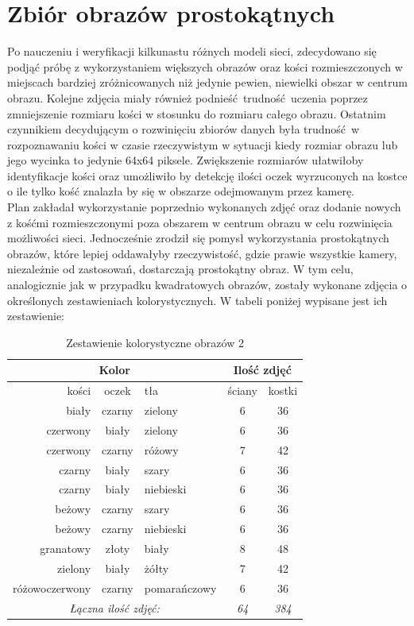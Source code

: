  \section{Zbiór obrazów prostokątnych}

Po nauczeniu i weryfikacji kilkunastu różnych modeli sieci, zdecydowano się podjąć
próbę z wykorzystaniem większych obrazów oraz kości rozmieszczonych w miejscach
bardziej zróżnicowanych niż jedynie pewien, niewielki obszar w centrum obrazu.
Kolejne zdjęcia miały również podnieść trudność uczenia poprzez zmniejszenie
rozmiaru kości w stosunku do rozmiaru całego obrazu. Ostatnim czynnikiem decydującym o
rozwinięciu zbiorów danych była trudność w rozpoznawaniu kości w czasie rzeczywistym
w sytuacji kiedy rozmiar obrazu lub jego wycinka to jedynie 64x64 piksele. Zwiększenie
rozmiarów ułatwiłoby identyfikacje kości oraz umożliwiło by detekcję ilości oczek
wyrzuconych na kostce o ile tylko kość znalazła by się w obszarze odejmowanym przez kamerę. \\
Plan zakładał wykorzystanie poprzednio wykonanych zdjęć oraz dodanie nowych
z kośćmi rozmieszczonymi poza obszarem w centrum obrazu w celu rozwinięcia możliwości sieci.
Jednocześnie zrodził się pomysł wykorzystania prostokątnych obrazów, które lepiej oddawałyby
rzeczywistość, gdzie prawie wszystkie kamery, niezależnie od zastosowań, dostarczają
prostokątny obraz. W tym celu, analogicznie jak w przypadku kwadratowych obrazów,
zostały wykonane zdjęcia o określonych zestawieniach kolorystycznych. W tabeli poniżej
wypisane jest ich zestawienie:

\begin{table}[h!]
\centering
\begin{tabular}{rcl|cc}
 \multicolumn{3}{c}{Kolor} & \multicolumn{2}{c}{Ilość zdjęć} \\ \hline
kości & oczek & tła & ściany & kostki \\ \hline
biały & czarny & zielony & 6 & 36 \\
czerwony & biały & zielony & 6 & 36 \\
czerwony & czarny & różowy & 7 & 42 \\
czarny & biały & szary & 6 & 36 \\
czarny & biały & niebieski & 6 & 36 \\
beżowy & czarny & szary & 6 & 36 \\
beżowy & czarny & niebieski & 6 & 36 \\
granatowy & złoty & biały & 8 & 48 \\
zielony & biały & żółty & 7 & 42 \\
różowoczerwony & czarny & pomarańczowy & 6 & 36 \\ \hline
\multicolumn{3}{c}{\textit{Łączna ilość zdjęć:}} & \textit{64} & \textit{384}
\end{tabular}
\vspace{0.2cm}
\caption{Zestawienie kolorystyczne obrazów 2}
\label{tab:zestawienie2}
\end{table}


